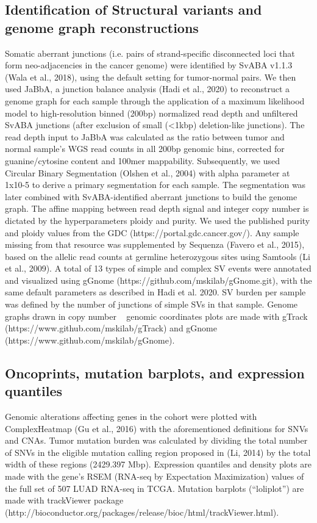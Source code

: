 \documentclass[phd,tocprelim]{cornell}
\begin{document}
\subsection*{Identification of Structural variants and genome graph reconstructions}
Somatic aberrant junctions (i.e. pairs of strand-specific disconnected loci that form neo-adjacencies in the cancer genome) were identified by SvABA v1.1.3 (Wala et al., 2018), using the default setting for tumor-normal pairs. We then used JaBbA, a junction balance analysis (Hadi et al., 2020) to reconstruct a genome graph for each sample through the application of a maximum likelihood model to high-resolution binned (200bp) normalized read depth and unfiltered SvABA junctions (after exclusion of small (<1kbp) deletion-like junctions). The read depth input to JaBbA was calculated as the ratio between tumor and normal sample’s WGS read counts in all 200bp genomic bins, corrected for guanine/cytosine content and 100mer mappability. Subsequently, we used Circular Binary Segmentation (Olshen et al., 2004) with alpha parameter at 1x10-5 to derive a primary segmentation for each sample. The segmentation was later combined with SvABA-identified aberrant junctions to build the genome graph. The affine mapping between read depth signal and integer copy number is dictated by the hyperparameters ploidy and purity. We used the published purity and ploidy values from the GDC (https://portal.gdc.cancer.gov/). Any sample missing from that resource was supplemented by Sequenza (Favero et al., 2015), based on the allelic read counts at germline heterozygous sites using Samtools (Li et al., 2009). A total of 13 types of simple and complex SV events were annotated and visualized using gGnome (https://github.com/mskilab/gGnome.git), with the same default parameters as described in Hadi et al. 2020. SV burden per sample was defined by the number of junctions of simple SVs in that sample. Genome graphs drawn in copy number ~ genomic coordinates plots are made with gTrack (https://www.github.com/mskilab/gTrack) and gGnome (https://www.github.com/mskilab/gGnome).

\subsection*{Oncoprints, mutation barplots, and expression quantiles}
Genomic alterations affecting genes in the cohort were plotted with ComplexHeatmap (Gu et al., 2016) with the aforementioned definitions for SNVs and CNAs. Tumor mutation burden was calculated by dividing the total number of SNVs in the eligible mutation calling region proposed in (Li, 2014) by the total width of these regions (2429.397 Mbp). Expression quantiles and density plots are made with the gene’s RSEM (RNA-seq by Expectation Maximization) values of the full set of 507 LUAD RNA-seq in TCGA. Mutation barplots (“loliplot”) are made with trackViewer package (http://bioconductor.org/packages/release/bioc/html/trackViewer.html).
\end{document}

